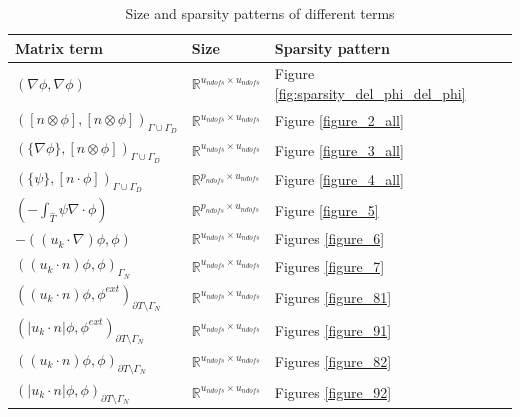 \documentclass[a4paper,openany]{book}
\begin{document}
\begin{table}[H]
\caption{Size and sparsity patterns of different terms}
\begin{center}
\begin{tabular}{|p{}| p{} |  p{}|}
\hline
\textbf{Matrix term} & \textbf{Size} & \textbf{Sparsity pattern} \\
\hline
$(\nabla \phi, \nabla \phi)$ & $\mathbb{R}^{u_{ndofs} \times u_{ndofs}}$ & Figure \ref{fig:sparsity_del_phi_del_phi}\\
\hline
$([n \otimes \phi],[n \otimes \phi])_{\Gamma \cup \Gamma_D}$ & $\mathbb{R}^{u_{ndofs} \times u_{ndofs}}$ & Figure \ref{figure_2_all}\\
\hline
$(\lbrace \nabla \phi \rbrace,[n \otimes \phi])_{\Gamma \cup \Gamma_D}$ & $\mathbb{R}^{u_{ndofs} \times u_{ndofs}}$ & Figure \ref{figure_3_all}\\
\hline
$(\lbrace \psi \rbrace,[n \cdot \phi])_{\Gamma \cup \Gamma_D}$ & $\mathbb{R}^{p_{ndofs} \times u_{ndofs}}$ & Figure \ref{figure_4_all}\\
\hline
$(- \int_{\hat{T}} \psi \nabla \cdot \phi)$ & $\mathbb{R}^{p_{ndofs} \times u_{ndofs}}$ & Figure \ref{figure_5} \\
\hline
$-((u_k \cdot \nabla)\phi , \phi)$ & $\mathbb{R}^{u_{ndofs} \times u_{ndofs}}$ & Figures \ref{figure_6}\\
\hline
$((u_k \cdot n)\phi , \phi)_{\Gamma_N}$ & $\mathbb{R}^{u_{ndofs} \times u_{ndofs}}$ & Figures \ref{figure_7}\\
\hline
$((u_k \cdot n)\phi,\phi^{ext})_{\partial T \setminus \Gamma_N}$ & $\mathbb{R}^{u_{ndofs} \times u_{ndofs}}$ & Figures \ref{figure_81}\\
\hline
$(|u_k \cdot n|\phi,\phi^{ext})_{\partial T \setminus \Gamma_N}$ & $\mathbb{R}^{u_{ndofs} \times u_{ndofs}}$ & Figures \ref{figure_91}\\
\hline
$((u_k \cdot n)\phi,\phi)_{\partial T \setminus \Gamma_N}$ & $\mathbb{R}^{u_{ndofs} \times u_{ndofs}}$ & Figures \ref{figure_82}\\
\hline
$(|u_k \cdot n|\phi,\phi)_{\partial T \setminus \Gamma_N}$ & $\mathbb{R}^{u_{ndofs} \times u_{ndofs}}$ & Figures \ref{figure_92}\\
\hline
\end{tabular}
\end{center}
\end{table}
\end{document}
